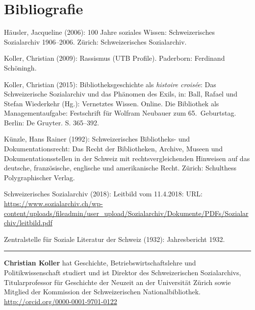 \documentclass[a4paper,
fontsize=11pt,
oneside,
numbers=noperiodatend,
parskip=half-,
bibliography=totoc,
final
]{scrartcl}
\begin{document}
\hypertarget{bibliografie}{%
\section{Bibliografie}\label{bibliografie}}

Häusler, Jacqueline (2006): 100 Jahre soziales Wissen: Schweizerisches
Sozialarchiv 1906--2006. Zürich: Schweizerisches Sozialarchiv.

Koller, Christian (2009): Rassismus (UTB Profile). Paderborn: Ferdinand
Schöningh.

Koller, Christian (2015): Bibliotheksgeschichte als \emph{histoire
croisée}: Das Schweizerische Sozialarchiv und das Phänomen des Exils,
in: Ball, Rafael und Stefan Wiederkehr (Hg.): Vernetztes Wissen. Online.
Die Bibliothek als Managementaufgabe: Festschrift für Wolfram Neubauer
zum 65.~Geburtstag. Berlin: De Gruyter. S. 365--392.

Künzle, Hans Rainer (1992): Schweizerisches Bibliotheks- und
Dokumentationsrecht: Das Recht der Bibliotheken, Archive, Museen und
Dokumentationsstellen in der Schweiz mit rechtsvergleichenden Hinweisen
auf das deutsche, französische, englische und amerikanische Recht.
Zürich: Schulthess Polygraphischer Verlag.

Schweizerisches Sozialarchiv (2018): Leitbild vom 11.4.2018: URL:
\url{https://www.sozialarchiv.ch/wp-content/uploads/fileadmin/user_upload/Sozialarchiv/Dokumente/PDFs/Sozialarchiv/leitbild.pdf}

Zentralstelle für Soziale Literatur der Schweiz (1932): Jahresbericht
1932.

\begin{center}\rule{0.5\linewidth}{\linethickness}\end{center}

\textbf{Christian Koller} hat Geschichte, Betriebswirtschaftslehre und
Politikwissenschaft studiert und ist Direktor des Schweizerischen
Sozialarchivs, Titularprofessor für Geschichte der Neuzeit an der
Universität Zürich sowie Mitglied der Kommission der Schweizerischen
Nationalbibliothek. \url{http://orcid.org/0000-0001-9701-0122}
\end{document}
